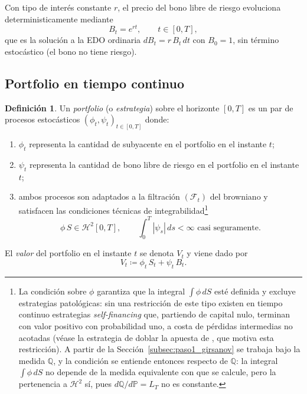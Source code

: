\documentclass[11pt,a4paper,oneside]{report}
\theoremstyle{plain}
\theoremstyle{definition}
\newtheorem{definicion}[teorema]{Definición}
\theoremstyle{remark}
\newcommand{\PP}{\mathbb{P}}
\newcommand{\Q}{\mathbb{Q}}
\newcommand{\F}{\mathcal{F}}
\newcommand{\1}{\mathbf{1}}
\newcommand{\eqdef}{\coloneqq}
\begin{document}
Con tipo de interés constante
$r$, el precio del bono libre de riesgo evoluciona deterministicamente
mediante
\begin{equation}\label{eq:bs_bono}
  B_t = e^{rt},
  \qquad t \in [0, T],
\end{equation}
que es la solución a la EDO ordinaria $dB_t = r\, B_t\, dt$ con
$B_0 = 1$, sin término
estocástico (el bono no tiene riesgo).

\subsection{Portfolio en tiempo continuo}
\label{subsec:portfolio_continuo}

\begin{definicion}
\label{def:portfolio_continuo}
Un \emph{portfolio} (o \emph{estrategia}) sobre el horizonte $[0, T]$
es un par de procesos estocásticos $(\phi_t, \psi_t)_{t \in [0, T]}$
donde:
\begin{enumerate}[label=\textnormal{(\roman*)}]
  \item $\phi_t$ representa la cantidad de subyacente en el portfolio
        en el instante $t$;
  \item $\psi_t$ representa la cantidad de bono libre de riesgo en el
        portfolio en el instante $t$;
  \item ambos procesos son adaptados a la filtración $(\F_t)$ del
        browniano y satisfacen las condiciones técnicas de
        integrabilidad\footnote{La condición sobre $\phi$ garantiza que la integral $\int \phi\, dS$ esté definida y excluye estrategias patológicas: sin una restricción de este tipo existen en tiempo continuo estrategias \emph{self-financing} que, partiendo de capital nulo, terminan con valor positivo con probabilidad uno, a costa de pérdidas intermedias no acotadas (véase la estrategia de doblar la apuesta de \cite[Ejemplo~5.1.1]{etheridge}, que motiva esta restricción). A partir de la Sección~\ref{subsec:paso1_girsanov} se trabaja bajo la medida $\Q$, y la condición se entiende entonces respecto de $\Q$: la integral $\int \phi\, dS$ no depende de la medida equivalente con que se calcule, pero la pertenencia a $\mathcal{H}^2$ sí, pues $d\Q/d\PP = L_T$ no es constante.}
        \begin{equation*}
          \phi\, S \in \mathcal{H}^2[0, T], \qquad
          \int_0^T |\psi_s|\, ds < \infty \text{ casi seguramente}.
        \end{equation*}
\end{enumerate}
El \emph{valor} del portfolio en el instante $t$ se denota $V_t$ y
viene dado por
\begin{equation}\label{eq:valor_portfolio}
  V_t \eqdef \phi_t\, S_t + \psi_t\, B_t.
\end{equation}
\end{definicion}
\end{document}
